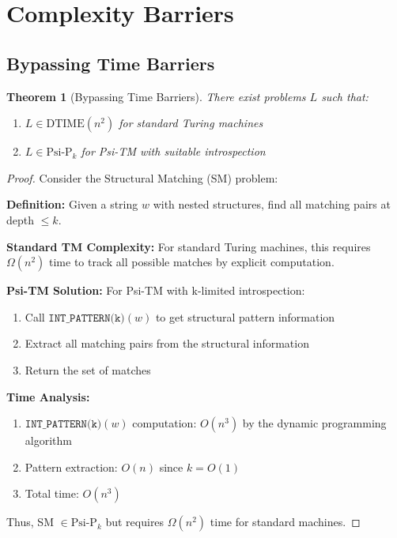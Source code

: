 \documentclass[11pt]{article}
\newtheorem{theorem}{Theorem}
\begin{document}
\section{Complexity Barriers}

\subsection{Bypassing Time Barriers}

\begin{theorem}[Bypassing Time Barriers]
There exist problems $L$ such that:
\begin{enumerate}
\item $L \in \text{DTIME}(n^2)$ for standard Turing machines
\item $L \in \text{Psi-P}_k$ for Psi-TM with suitable introspection
\end{enumerate}
\end{theorem}

\begin{proof}
Consider the Structural Matching (SM) problem:

\textbf{Definition:} Given a string $w$ with nested structures, find all matching pairs at depth $\leq k$.

\textbf{Standard TM Complexity:}
For standard Turing machines, this requires $\Omega(n^2)$ time to track all possible matches by explicit computation.

\textbf{Psi-TM Solution:}
For Psi-TM with k-limited introspection:
\begin{enumerate}
\item Call $\texttt{INT\_PATTERN(k)}(w)$ to get structural pattern information
\item Extract all matching pairs from the structural information
\item Return the set of matches
\end{enumerate}

\textbf{Time Analysis:}
\begin{enumerate}
\item $\texttt{INT\_PATTERN(k)}(w)$ computation: $O(n^3)$ by the dynamic programming algorithm
\item Pattern extraction: $O(n)$ since $k = O(1)$
\item Total time: $O(n^3)$
\end{enumerate}

Thus, SM $\in \text{Psi-P}_k$ but requires $\Omega(n^2)$ time for standard machines.
\end{proof}
\end{document}
